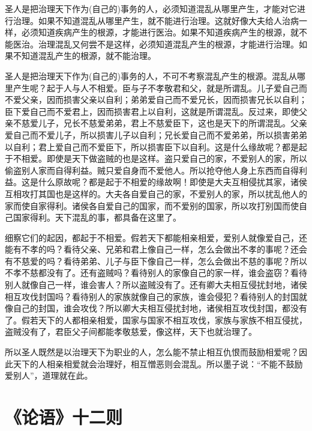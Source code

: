 \documentclass[12pt,UTF-8,openany,a4]{ctexbook}
\begin{document}
\begin{large}
    \yiwen 
    圣人是把治理天下作为(自己的)事务的人，必须知道混乱从哪里产生，才能对它进行治理。如果不知道混乱从哪里产生，就不能进行治理。这就好像大夫给人治病一样，必须知道疾病产生的根源，才能进行医治。如果不知道疾病产生的根源，就不能医治。治理混乱又何尝不是这样，必须知道混乱产生的根源，才能进行治理。如果不知道混乱产生的根源，就不能治理。
    
    圣人是把治理天下作为(自己的)事务的人，不可不考察混乱产生的根源。混乱从哪里产生呢？起于人与人不相爱。臣与子不孝敬君和父，就是所谓乱。儿子爱自己而不爱父亲，因而损害父亲以自利；弟弟爱自己而不爱兄长，因而损害兄长以自利；臣下爱自己而不爱君上，因而损害君上以自利，这就是所谓混乱。反过来，即使父亲不慈爱儿子，兄长不慈爱弟弟，君上不慈爱臣下，这也是天下的所谓混乱。父亲爱自己而不爱儿子，所以损害儿子以自利；兄长爱自己而不爱弟弟，所以损害弟弟以自利；君上爱自己而不爱臣下，所以损害臣下以自利。这是什么缘故呢？都是起于不相爱。即使是天下做盗贼的也是这样。盗只爱自己的家，不爱别人的家，所以偷盗别人家而自得利益。贼只爱自身而不爱他人。所以抢夺他人身上东西而自得利益。这是什么原故呢？都是起于不相爱的缘故啊！即使是大夫互相侵扰其家，诸侯互相攻打其国也是这样的。大夫各自爱自己的家，不爱别人的家，所以扰乱他人的家而使自家得利。诸侯各自爱自己的国家，而不爱别的国家，所以攻打别国而使自己国家得利。天下混乱的事，都具备在这里了。
    
    细察它们的起因，都起于不相爱。假若天下都能相亲相爱，爱别人就像爱自己，还能有不孝的吗？看待父亲、兄弟和君上像自己一样，怎么会做出不孝的事呢？还会有不慈爱的吗？看待弟弟、儿子与臣下像自己一样，怎么会做出不慈的事呢？所以不孝不慈都没有了。还有盗贼吗？看待别人的家像自己的家一样，谁会盗窃？看待别人就像自己一样，谁会害人？所以盗贼没有了。还有卿大夫相互侵扰封地，诸侯相互攻伐封国吗？看待别人的家族就像自己的家族，谁会侵犯？看待别人的封国就像自己的封国，谁会攻伐？所以卿大夫相互侵扰封地，诸侯相互攻伐封国，都没有了。假若天下的人都相亲相爱，国家与国家不相互攻伐，家族与家族不相互侵扰，盗贼没有了，君臣父子间都能孝敬慈爱，像这样，天下也就治理了。
    
    所以圣人既然是以治理天下为职业的人，怎么能不禁止相互仇恨而鼓励相爱呢？因此天下的人相亲相爱就会治理好，相互憎恶则会混乱。所以墨子说：“不能不鼓励爱别人”，道理就在此。
    
\end{large}



\chapter{《论语》十二则}
\end{document}
